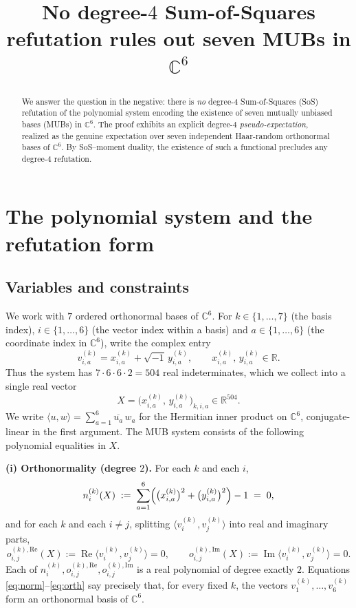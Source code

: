 \documentclass{amsart}
\theoremstyle{definition}
\theoremstyle{remark}
\begin{document}
\title{No degree-$4$ Sum-of-Squares refutation rules out seven MUBs in $\mathbb{C}^6$}
\maketitle

\begin{abstract}
We answer the question in the negative: there is \emph{no} degree-$4$ Sum-of-Squares
(SoS) refutation of the polynomial system encoding the existence of seven mutually
unbiased bases (MUBs) in $\mathbb{C}^6$. The proof exhibits an explicit degree-$4$
\emph{pseudo-expectation}, realized as the genuine expectation over seven independent
Haar-random orthonormal bases of $\mathbb{C}^6$. By SoS--moment duality, the existence of
such a functional precludes any degree-$4$ refutation.
\end{abstract}

\section{The polynomial system and the refutation form}\label{sec:setup}

\subsection{Variables and constraints}
We work with $7$ ordered orthonormal bases of $\mathbb{C}^6$. For $k\in\{1,\dots,7\}$
(the basis index), $i\in\{1,\dots,6\}$ (the vector index within a basis) and
$a\in\{1,\dots,6\}$ (the coordinate index in $\mathbb{C}^6$), write the complex entry
\[
v^{(k)}_{i,a}=x^{(k)}_{i,a}+\sqrt{-1}\,y^{(k)}_{i,a},
\qquad x^{(k)}_{i,a},\,y^{(k)}_{i,a}\in\mathbb{R}.
\]
Thus the system has $7\cdot 6\cdot 6\cdot 2 = 504$ real indeterminates, which we collect
into a single real vector
\[
X=\bigl(x^{(k)}_{i,a},\,y^{(k)}_{i,a}\bigr)_{k,i,a}\in\mathbb{R}^{504}.
\]
We write $\langle u,w\rangle=\sum_{a=1}^{6}\overline{u_a}\,w_a$ for the Hermitian inner
product on $\mathbb{C}^6$, conjugate-linear in the first argument. The MUB system consists
of the following polynomial equalities in $X$.

\medskip
\noindent\textbf{(i) Orthonormality (degree $2$).} For each $k$ and each $i$,
\begin{equation}\label{eq:norm}
n^{(k)}_{i}(X)\;:=\;\sum_{a=1}^{6}\Bigl(\bigl(x^{(k)}_{i,a}\bigr)^2+\bigl(y^{(k)}_{i,a}\bigr)^2\Bigr)-1\;=\;0,
\end{equation}
and for each $k$ and each $i\ne j$, splitting $\langle v^{(k)}_i,v^{(k)}_j\rangle$ into real
and imaginary parts,
\begin{equation}\label{eq:orth}
o^{(k),\mathrm{Re}}_{i,j}(X):=\operatorname{Re}\langle v^{(k)}_i,v^{(k)}_j\rangle=0,
\qquad
o^{(k),\mathrm{Im}}_{i,j}(X):=\operatorname{Im}\langle v^{(k)}_i,v^{(k)}_j\rangle=0 .
\end{equation}
Each of $n^{(k)}_i,o^{(k),\mathrm{Re}}_{i,j},o^{(k),\mathrm{Im}}_{i,j}$ is a real polynomial
of degree exactly $2$. Equations \eqref{eq:norm}--\eqref{eq:orth} say precisely that, for
every fixed $k$, the vectors $v^{(k)}_1,\dots,v^{(k)}_6$ form an orthonormal basis of
$\mathbb{C}^6$.
\end{document}
